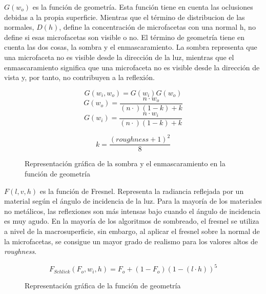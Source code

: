             $G(w_o)$ es la funci\'on de geometr\'ia. Esta funci\'on tiene en cuenta las oclusiones debidas a la propia superficie.
            Mientras que el t\'ermino de distribucion de las normales, $D(h)$, define la concentraci\'on de microfacetas con una normal h,
            no define si esas microfacetas son visible o no. El t\'ermino de geometr\'ia tiene en cuenta las dos cosas, la sombra
            y el enmascaramiento. La sombra representa que una microfaceta no es visible desde la direcci\'on de la luz, mientras que el
            enmascaramiento significa que una microfaceta no es visible desde la direcci\'on de vista y, por tanto, no contribuyen
            a la reflexi\'on.
    
            $$
            G(w_i, w_o) = G(w_i)G(w_o)
            $$
            \singlespacing
            $$
            G(w_o) = \frac{n\cdot{w_o}}{(n\cdot) (1 - k) + k}
            $$
            \singlespacing
            $$
            G(w_i) = \frac{n\cdot{w_i}}{(n\cdot) (1 - k) + k}
            $$
            \singlespacing
    
            \begin{equation}
            k = \frac{(roughness + 1)^2}{8}
            \end{equation}
    
            \begin{figure}[H]
                \vspace{0.5cm}
                \centering
                \caption{Representaci\'on gr\'afica de la sombra y el enmascaramiento en la funci\'on de geometr\'ia}
            \end{figure}
    
            $F(l, v, h)$ es la funci\'on de Fresnel. Representa la radiancia reflejada por un material seg\'un el \'angulo de incidencia
            de la luz. Para la mayor\'ia de los materiales no met\'alicos, las reflexiones son m\'as intensas bajo cuando el \'angulo
            de incidencia es muy agudo. En la mayor\'ia de los algoritmos de sombreado, el fresnel se utiliza a nivel de la macrosuperficie,
            sin embargo, al aplicar el fresnel sobre la normal de la microfacetas, se consigue un mayor grado de realismo para los valores
            altos de \textit{roughness}.
    
            $$
            F_{Schlick}(F_o, w_i, h) = F_o + (1 - F_o) (1 - (l\cdot{h}))^5
            $$
    
            \begin{figure}[H]
                \vspace{0.5cm}
                \centering
                \caption{Representaci\'on gr\'afica de la funci\'on de geometr\'ia}
            \end{figure}
            \singlespacing
    
